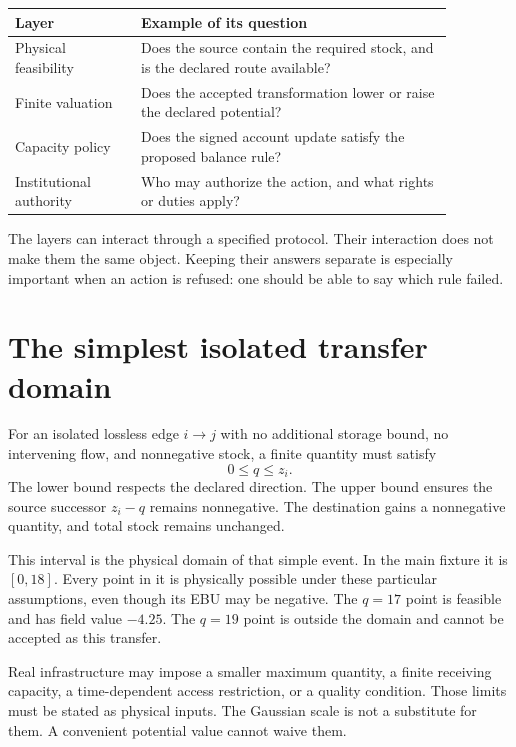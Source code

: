 \begin{center}
\begin{tabular}{P{0.25\linewidth}P{0.62\linewidth}}
\toprule
Layer & Example of its question\\
\midrule
Physical feasibility & Does the source contain the required stock, and is the declared route available?\\
Finite valuation & Does the accepted transformation lower or raise the declared potential?\\
Capacity policy & Does the signed account update satisfy the proposed balance rule?\\
Institutional authority & Who may authorize the action, and what rights or duties apply?\\
\bottomrule
\end{tabular}
\end{center}
The layers can interact through a specified protocol. Their interaction does not make them the same object. Keeping their answers separate is especially important when an action is refused: one should be able to say which rule failed.

\section{The simplest isolated transfer domain}
For an isolated lossless edge \(i\to j\) with no additional storage bound, no intervening flow, and nonnegative stock, a finite quantity must satisfy
\begin{equation}
 0\leq q\leq z_i.
\end{equation}
The lower bound respects the declared direction. The upper bound ensures the source successor \(z_i-q\) remains nonnegative. The destination gains a nonnegative quantity, and total stock remains unchanged.

This interval is the physical domain of that simple event. In the main fixture it is \([0,18]\). Every point in it is physically possible under these particular assumptions, even though its EBU may be negative. The \(q=17\) point is feasible and has field value \(-4.25\). The \(q=19\) point is outside the domain and cannot be accepted as this transfer.

Real infrastructure may impose a smaller maximum quantity, a finite receiving capacity, a time-dependent access restriction, or a quality condition. Those limits must be stated as physical inputs. The Gaussian scale is not a substitute for them. A convenient potential value cannot waive them.

